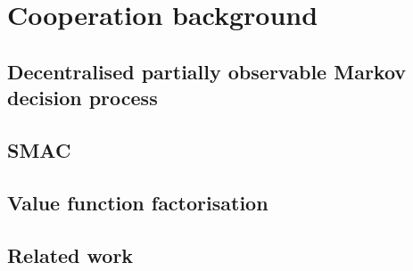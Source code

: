 \chapter{Cooperation background}\label{ch:cooperation}
\section{Decentralised partially observable Markov decision process}
\section{SMAC}
\section{Value function factorisation}
\section{Related work}

